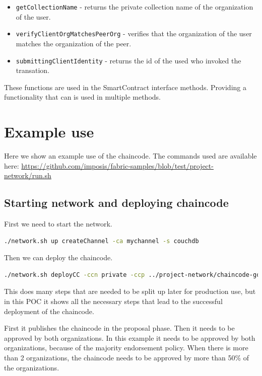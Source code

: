 \documentclass[12pt]{article}
\begin{document}
\begin{itemize}
    \item \texttt{getCollectionName} - returns the private collection name of the organization of the user.
    \item \texttt{verifyClientOrgMatchesPeerOrg} - verifies that the organization of the user matches the organization of the peer.
    \item \texttt{submittingClientIdentity} - returns the id of the used who invoked the transation.
\end{itemize}

These functions are used in the SmartContract interface methods. Providing a functionality that can is used in multiple methods.

\newpage

\section{Example use}

Here we show an example use of the chaincode. The commands used are available here: \url{https://github.com/imposis/fabric-samples/blob/test/project-network/run.sh}

\subsection{Starting network and deploying chaincode}

First we need to start the network.

\begin{lstlisting}[language=bash]
./network.sh up createChannel -ca mychannel -s couchdb
\end{lstlisting}

Then we can deploy the chaincode.

\begin{lstlisting}[language=bash]
./network.sh deployCC -ccn private -ccp ../project-network/chaincode-go/ -ccl go -ccep "OR('Org2MSP.peer','Org2MSP.peer')" -cccg ../project-network/chaincode-go/collections_config.json
\end{lstlisting}

This does many steps that are needed to be split up later for production use, but in this POC it shows all the necessary steps that lead to the successful deployment of the chaincode.

First it publishes the chaincode in the proposal phase.
Then it needs to be approved by both organizations. In this example it needs to be approved by both organizations, because of the majority endorsement policy.
When there is more than 2 organizations, the chaincode needs to be approved by more than 50\% of the organizations.
\end{document}
